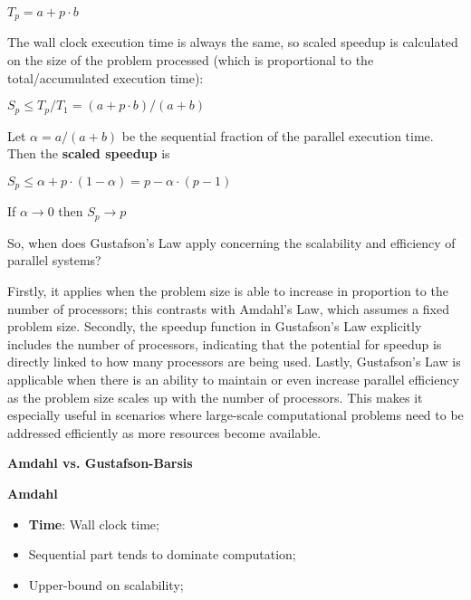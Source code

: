 \begin{center}
    $T_p = a + p\cdot b$
\end{center}
\par The wall clock execution time is always the same, so scaled speedup is calculated on the size of the problem processed (which is proportional to the total/accumulated execution time):
\begin{center}
    $S_p \leq T_p/T_1 = (a+p\cdot b)/(a+b)$
\end{center}
\par Let $\alpha = a/(a+b)$ be the sequential fraction of the parallel execution time. Then the \textbf{scaled speedup} is
\begin{center}
    $S_p \leq \alpha + p\cdot(1-\alpha) = p-\alpha\cdot(p-1)$
\end{center}
\par If $\alpha \rightarrow 0$ then $S_p \rightarrow p$
\par So, when does Gustafson's Law apply concerning the scalability and efficiency of parallel systems?
\par Firstly, it applies when the problem size is able to increase in proportion to the number of processors; this contrasts with Amdahl's Law, which assumes a fixed problem size. Secondly, the speedup function in Gustafson's Law explicitly includes the number of processors, indicating that the potential for speedup is directly linked to how many processors are being used. Lastly, Gustafson's Law is applicable when there is an ability to maintain or even increase parallel efficiency as the problem size scales up with the number of processors. This makes it especially useful in scenarios where large-scale computational problems need to be addressed efficiently as more resources become available. %
\par{\large\textbf{Amdahl vs. Gustafson-Barsis}}\\
\begin{minipage}[t]{0.5\textwidth}
    \par {\large \textbf{Amdahl}}
    \begin{itemize}
        \item \textbf{Time}: Wall clock time;
        \item Sequential part tends to dominate computation;
        \item Upper-bound on scalability;
    \end{itemize}
\end{minipage}
